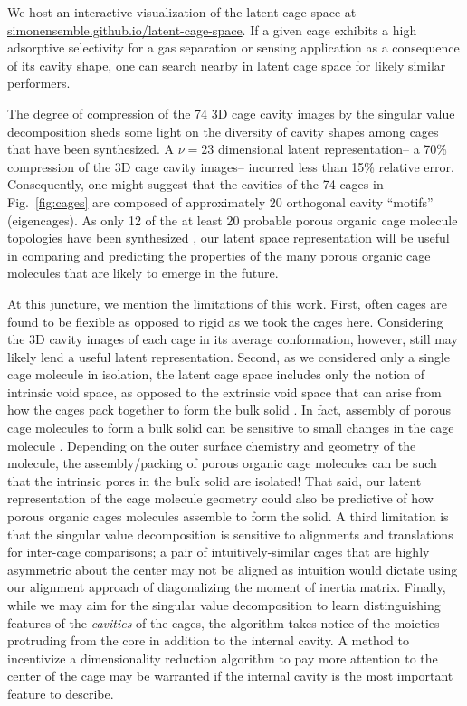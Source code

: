 \documentclass[journal=jacsat,manuscript=article,layout=traditional]{achemso}
\begin{document}
We host an interactive visualization of the latent cage space at \url{simonensemble.github.io/latent-cage-space}. If a given cage exhibits a high adsorptive selectivity for a gas separation or sensing application as a consequence of its cavity shape, one can search nearby in latent cage space for likely similar performers.

The degree of compression of the 74 3D cage cavity images by the singular value decomposition sheds some light on the diversity of cavity shapes among cages that have been synthesized. A $\nu=23$ dimensional latent representation-- a 70\% compression of the 3D cage cavity images-- incurred less than 15\% relative error. Consequently, one might suggest that the cavities of the 74 cages in Fig.~\ref{fig:cages} are composed of approximately 20 orthogonal cavity ``motifs'' (eigencages). As only 12 of the at least 20 probable porous organic cage molecule topologies have been synthesized \cite{santolini2017topological}, our latent space representation will be useful in comparing and predicting the properties of the many porous organic cage molecules that are likely to emerge in the future.

At this juncture, we mention the limitations of this work. First, often cages are found to be flexible \cite{chen2014separation,camp2016transition,holden2014gas,holden2016understanding} as opposed to rigid as we took the cages here. Considering the 3D cavity images of each cage in its average conformation, however, still may likely lend a useful latent representation. Second, as we considered only a single cage molecule in isolation, the latent cage space includes only the notion of intrinsic void space, as opposed to the extrinsic void space that can arise from how the cages pack together to form the bulk solid \cite{hasell2016porous}. In fact, assembly of porous cage molecules to form a bulk solid can be sensitive to small changes in the cage molecule \cite{hasell2014controlling}. Depending on the outer surface chemistry and geometry of the molecule, the assembly/packing of porous organic cage molecules can be such that the intrinsic pores in the bulk solid are isolated!\cite{tozawa2009porous} That said, our latent representation of the cage molecule geometry could also be predictive of how porous organic cages molecules assemble to form the solid. A third limitation is that the singular value decomposition is sensitive to alignments and translations for inter-cage comparisons; a pair of intuitively-similar cages that are highly asymmetric about the center may not be aligned as intuition would dictate using our alignment approach of diagonalizing the moment of inertia matrix. Finally, while we may aim for the singular value decomposition to learn distinguishing features of the \emph{cavities} of the cages, the algorithm takes notice of the moieties protruding from the core in addition to the internal cavity. A method to incentivize a dimensionality reduction algorithm to pay more attention to the center of the cage may be warranted if the internal cavity is the most important feature to describe. 
\end{document}
